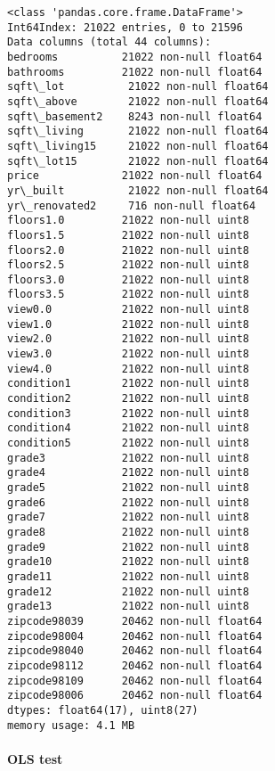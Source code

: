 \documentclass[11pt]{article}
\begin{document}
    \begin{Verbatim}[commandchars=\\\{\}]
<class 'pandas.core.frame.DataFrame'>
Int64Index: 21022 entries, 0 to 21596
Data columns (total 44 columns):
bedrooms          21022 non-null float64
bathrooms         21022 non-null float64
sqft\_lot          21022 non-null float64
sqft\_above        21022 non-null float64
sqft\_basement2    8243 non-null float64
sqft\_living       21022 non-null float64
sqft\_living15     21022 non-null float64
sqft\_lot15        21022 non-null float64
price             21022 non-null float64
yr\_built          21022 non-null float64
yr\_renovated2     716 non-null float64
floors1.0         21022 non-null uint8
floors1.5         21022 non-null uint8
floors2.0         21022 non-null uint8
floors2.5         21022 non-null uint8
floors3.0         21022 non-null uint8
floors3.5         21022 non-null uint8
view0.0           21022 non-null uint8
view1.0           21022 non-null uint8
view2.0           21022 non-null uint8
view3.0           21022 non-null uint8
view4.0           21022 non-null uint8
condition1        21022 non-null uint8
condition2        21022 non-null uint8
condition3        21022 non-null uint8
condition4        21022 non-null uint8
condition5        21022 non-null uint8
grade3            21022 non-null uint8
grade4            21022 non-null uint8
grade5            21022 non-null uint8
grade6            21022 non-null uint8
grade7            21022 non-null uint8
grade8            21022 non-null uint8
grade9            21022 non-null uint8
grade10           21022 non-null uint8
grade11           21022 non-null uint8
grade12           21022 non-null uint8
grade13           21022 non-null uint8
zipcode98039      20462 non-null float64
zipcode98004      20462 non-null float64
zipcode98040      20462 non-null float64
zipcode98112      20462 non-null float64
zipcode98109      20462 non-null float64
zipcode98006      20462 non-null float64
dtypes: float64(17), uint8(27)
memory usage: 4.1 MB

    \end{Verbatim}

    \paragraph{OLS test}\label{ols-test}
\end{document}
